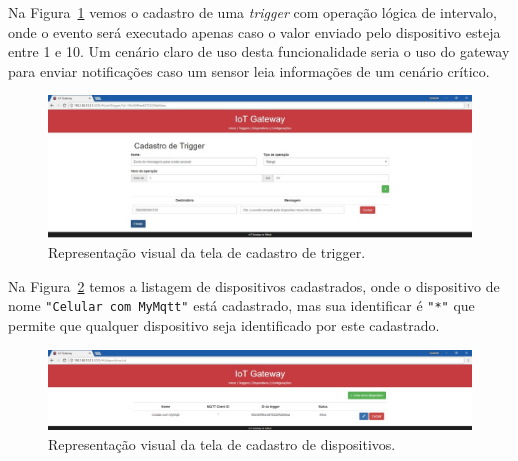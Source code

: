 Na Figura~\ref{fig:triggerCadastrada} vemos o cadastro de uma \textit{trigger} com operação lógica de intervalo, onde o evento será executado apenas caso o valor enviado pelo dispositivo esteja entre 1 e 10. Um cenário claro de uso desta funcionalidade seria o uso do gateway para enviar notificações caso um sensor leia informações de um cenário crítico.
\begin{figure}[h!]
	\begin{center}
		\includegraphics[width=1.085\textwidth]{./img/triggerCadastrada}
		\caption{Representação visual da tela de cadastro de trigger.}
		\label{fig:triggerCadastrada}
	\end{center}
\end{figure}

Na Figura~\ref{fig:dispositivoCadastrado} temos a listagem de dispositivos cadastrados, onde o dispositivo de nome \verb|"Celular com MyMqtt"| está cadastrado, mas sua identificar é \verb|"*"| que permite que qualquer dispositivo seja identificado por este cadastrado.
\begin{figure}[h!]
	\begin{center}
		\includegraphics[width=1.085\textwidth]{./img/dispositivoCadastrado}
		\caption{Representação visual da tela de cadastro de dispositivos.}
		\label{fig:dispositivoCadastrado}
	\end{center}
\end{figure}

